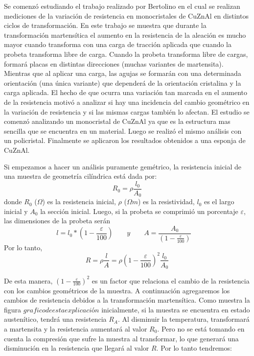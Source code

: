 \documentclass[a4paper,12pt,fleqn,twoside,openany]{book}
\begin{document}
Se comenzó estudiando el trabajo realizado por Bertolino \cite{resistencia} en el cual se realizan mediciones de la variación de resistencia en monocristales de CuZnAl en distintos ciclos de transformación. En este trabajo se muestra que durante la transformación martensítica el aumento en la resistencia de la aleación es mucho mayor  cuando transforma con una carga de tracción aplicada que cuando la probeta transforma libre de carga. Cuando la probeta transforma libre de cargas, formará placas en distintas direcciones (muchas variantes de martensita). Mientras que al aplicar una carga, las agujas se formarán con una determinada orientación (una única variante)  que dependerá de la orientación cristalina y la carga aplicada. El hecho de que ocurra una variación tan marcada en el aumento de la resistencia motivó a analizar si hay una incidencia del cambio geométrico en la variación de resistencia y si las mismas cargas también lo afectan. El estudio se comenzó analizando un monocristal de CuZnAl ya que es la estructura mas sencilla que se encuentra en un material. Luego se realizó el mismo análisis con un policristal. Finalmente se aplicaron los resultados obtenidos a una esponja de CuZnAl.

Si empezamos a hacer un análisis puramente gemétrico, la resistencia inicial de una muestra de geometría cilíndrica está dada por:
\begin{equation}
 R_0= \rho \frac{l_0}{A_0}
\end{equation}
donde $R_0$ ($\Omega$) es la resistencia inicial, $\rho$ ($\Omega m$) es la resistividad, $l_0$ es el largo inicial y $A_0$ la sección inicial.
Luego, si la probeta se comprimió un porcentaje $\varepsilon$, las dimensiones de la probeta serán 
\begin{equation*}
 l=l_0 * (1- \frac{\varepsilon}{100})
  \quad \quad y \quad \quad  
 A=\frac{A_0}{(1- \frac{\varepsilon}{100})} \quad 
\end{equation*}
Por lo tanto, 
\begin{equation}
R= \rho \frac{l}{A} = \rho (1-\frac{\varepsilon}{100})^2 \frac{l_0}{A_0} %
\end{equation}

De esta manera, $(1-\frac{\varepsilon}{100})^2$ es un factor que relaciona el cambio de la resistencia con los cambios geométricos de la muestra. A continuación agregaremos los cambios de resistencia debidos a la transformación martensítica. Como muestra la figura $grafico de esta explicación$ inicialmente, si la muestra se encuentra en estado austenítico, tendrá una resistencia $R_A$. Al disminuir la temperatura, transformará a martensita y la resistencia aumentará al valor $R_0$. Pero no se está tomando en cuenta la compresión que sufre la muestra al transformar, lo que generará una disminución en la resistencia que llegará al valor $R$. Por lo tanto tendremos:
\end{document}
